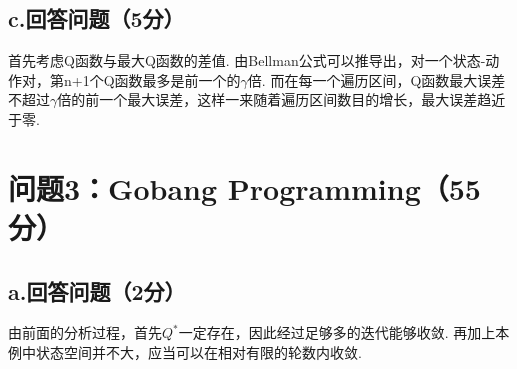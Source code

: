 \documentclass{article}
\begin{document}
\subsection*{c.回答问题（5分）}
首先考虑Q函数与最大Q函数的差值. 由Bellman公式可以推导出，对一个状态-动作对，第n+1个Q函数最多是前一个的$\gamma$倍. 
而在每一个遍历区间，Q函数最大误差不超过$\gamma$倍的前一个最大误差，这样一来随着遍历区间数目的增长，最大误差趋近于零.


\section*{问题3：Gobang Programming（55分）}
\subsection*{a.回答问题（2分）}
由前面的分析过程，首先$Q^*$一定存在，因此经过足够多的迭代能够收敛. 再加上本例中状态空间并不大，应当可以在相对有限的轮数内收敛.
\end{document}
